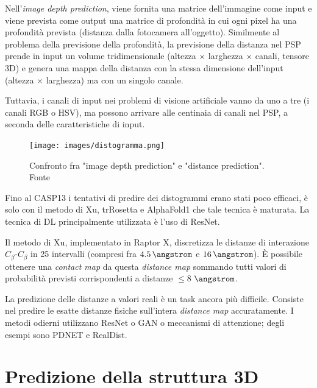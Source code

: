 \par Nell'\textit{image depth prediction}, viene fornita una matrice dell'immagine come input e viene prevista come output una matrice di profondità in cui ogni pixel ha una profondità prevista (distanza dalla fotocamera all'oggetto). Similmente al problema della previsione della profondità, la previsione della distanza nel PSP prende in input un volume tridimensionale (altezza × larghezza × canali, tensore 3D) e genera una mappa della distanza con la stessa dimensione dell'input (altezza × larghezza) ma con un singolo canale. 

\par Tuttavia, i canali di input nei problemi di visione artificiale vanno da uno a tre (i canali RGB o HSV), ma possono arrivare alle centinaia di canali nel PSP, a seconda delle caratteristiche di input.

\begin{figure}[!htb]
	\centering
	\texttt{[image: images/distogramma.png]}
	\caption{Confronto fra "image depth prediction" e "distance prediction". Fonte\cite{pakhrin2021deep}}
	\label{fig:distogramma-cane}
\end{figure}

\par Fino al CASP13 i tentativi di predire dei distogrammi erano stati poco efficaci, è solo con il metodo di Xu, trRosetta e AlphaFold1 che tale tecnica è maturata. La tecnica di DL principalmente utilizzata è l'uso di ResNet.

\par Il metodo di Xu, implementato in Raptor X, discretizza le distanze di interazione $C_{\beta}$-$C_{\beta}$ in 25 intervalli (compresi fra $4.5\, \angstrom$ e $16\, \angstrom$). È possibile ottenere una \textit{contact map} da questa \textit{distance map} sommando tutti valori di probabilità previsti corrispondenti a distanze $\leq 8$ $\angstrom$\supercite{pakhrin2021deep}. \\

\par La predizione delle distanze a valori reali è un task ancora più difficile. Consiste nel predire le esatte distanze fisiche sull'intera \textit{distance map} accuratamente. I metodi odierni utilizzano ResNet o GAN o meccanismi di attenzione; degli esempi sono PDNET e RealDist.

\section{Predizione della struttura 3D}

